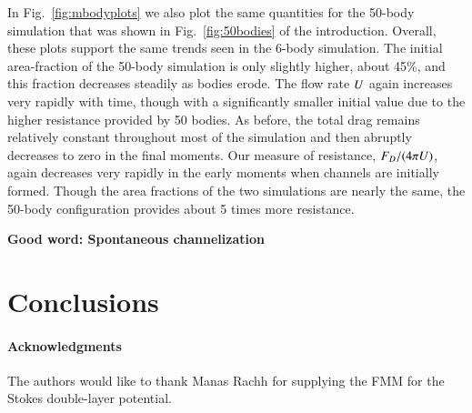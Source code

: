 \documentclass[preprint, 10pt]{elsarticle}
\begin{document}
In Fig.~\ref{fig:mbodyplots} we also plot the same quantities for the 50-body simulation that was shown in Fig.~\ref{fig:50bodies} of the introduction. Overall, these plots support the same trends seen in the 6-body simulation. The initial area-fraction of the 50-body simulation is only slightly higher, about 45\%, and this fraction decreases steadily as bodies erode. The flow rate $U$ again increases very rapidly with time, though with a significantly smaller initial value due to the higher resistance provided by 50 bodies. As before, the total drag remains relatively constant throughout most of the simulation and then abruptly decreases to zero in the final moments. Our measure of resistance, $F_D/(4 \pi U)$, again decreases very rapidly in the early moments when channels are initially formed. Though the area fractions of the two simulations are nearly the same, the 50-body configuration provides about 5 times more resistance.


{\bf Good word: Spontaneous channelization}



\section{Conclusions\label{s:conclusions}}


\paragraph{\bf Acknowledgments} The authors would like to thank Manas
Rachh for supplying the FMM for the Stokes double-layer potential.

 

\end{document}
